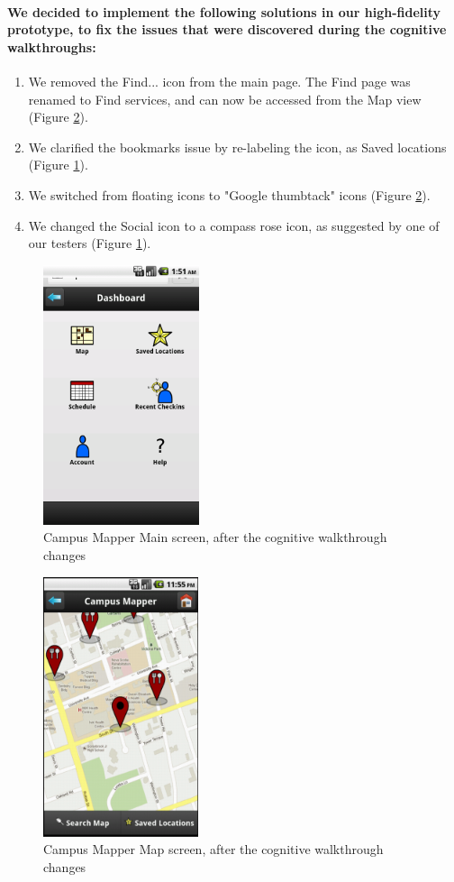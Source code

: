 \documentclass{report}
\begin{document}
    \paragraph{We decided to implement the following solutions in our
    high-fidelity prototype, to fix the issues that were discovered during the
    cognitive walkthroughs:}
    \begin{enumerate}
    \item We removed the Find... icon from the main page. The Find page was renamed to
    Find services, and can now be accessed from the Map view (Figure
    \ref{fig:cog-map}).
    \item We clarified the bookmarks issue by re-labeling the icon, as Saved locations
    (Figure \ref{fig:cog-dashboard}).
    \item We switched from floating icons to "Google thumbtack" icons (Figure
    \ref{fig:cog-map}).
    \item We changed the Social icon to a compass rose icon, as suggested by one of our
    testers (Figure \ref{fig:cog-dashboard}).
    \end{enumerate}
    \begin{figure}
        \centering
            \includegraphics[height=3in]{img/cw_dashboard.png}
        \caption{Campus Mapper Main screen, after the cognitive walkthrough changes} 
        \label{fig:cog-dashboard} 
    \end{figure}
    \begin{figure}
        \centering
            \includegraphics[height=3in]{img/cw_map-restaurant.png}
        \caption{Campus Mapper Map screen, after the cognitive walkthrough changes} 
        \label{fig:cog-map} 
    \end{figure}
\end{document}
